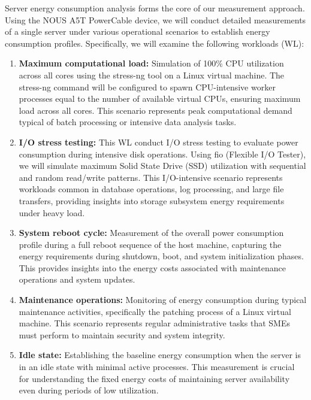 Server energy consumption analysis forms the core of our measurement approach.
Using the NOUS A5T PowerCable device, we will conduct detailed measurements of a
single server under various operational scenarios to establish energy consumption
profiles. Specifically, we will examine the following workloads (WL):

\begin{enumerate}[label=WL\arabic*]
    \item \textbf{Maximum computational load:} Simulation of 100\% CPU utilization across all
    cores using the stress-ng tool on a Linux virtual machine. The stress-ng
    command will be configured to spawn CPU-intensive worker processes equal to
    the number of available virtual CPUs, ensuring maximum load across all cores.
    This scenario represents peak computational demand typical of batch processing
    or intensive data analysis tasks. \cite{stressng2020}

    \item \textbf{I/O stress testing:} This WL conduct I/O stress testing to evaluate
    power consumption during intensive disk operations. Using fio (Flexible I/O Tester),
    we will simulate maximum Solid State Drive (SSD) utilization with sequential and random read/write
    patterns. This I/O-intensive scenario represents workloads common in database operations,
    log processing, and large file transfers, providing insights into storage
    subsystem energy requirements under heavy load.

    \item \textbf{System reboot cycle:} Measurement of the overall power consumption profile
    during a full reboot sequence of the host machine, capturing the energy
    requirements during shutdown, boot, and system initialization phases. This
    provides insights into the energy costs associated with maintenance operations
    and system updates.

    \item \textbf{Maintenance operations:} Monitoring of energy consumption during typical
    maintenance activities, specifically the patching process of a Linux virtual
    machine. This scenario represents regular administrative tasks that SMEs must
    perform to maintain security and system integrity.

    \item \textbf{Idle state:} Establishing the baseline energy consumption when the server is
    in an idle state with minimal active processes. This measurement is crucial
    for understanding the fixed energy costs of maintaining server availability
    even during periods of low utilization. \cite{moran2024dissecting,agilewatts2022}
\end{enumerate}

